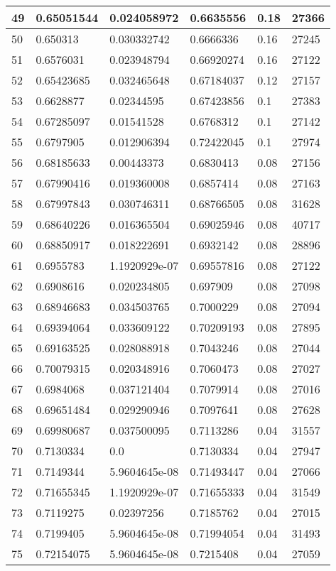 \begin{longtable}{|l|l|l|l|l|l|}
49 & 0.65051544 & 0.024058972 & 0.6635556 & 0.18 & 27366 \\ \hline 
50 & 0.650313 & 0.030332742 & 0.6666336 & 0.16 & 27245 \\ \hline 
51 & 0.6576031 & 0.023948794 & 0.66920274 & 0.16 & 27122 \\ \hline 
52 & 0.65423685 & 0.032465648 & 0.67184037 & 0.12 & 27157 \\ \hline 
53 & 0.6628877 & 0.02344595 & 0.67423856 & 0.1 & 27383 \\ \hline 
54 & 0.67285097 & 0.01541528 & 0.6768312 & 0.1 & 27142 \\ \hline 
55 & 0.6797905 & 0.012906394 & 0.72422045 & 0.1 & 27974 \\ \hline 
56 & 0.68185633 & 0.00443373 & 0.6830413 & 0.08 & 27156 \\ \hline 
57 & 0.67990416 & 0.019360008 & 0.6857414 & 0.08 & 27163 \\ \hline 
58 & 0.67997843 & 0.030746311 & 0.68766505 & 0.08 & 31628 \\ \hline 
59 & 0.68640226 & 0.016365504 & 0.69025946 & 0.08 & 40717 \\ \hline 
60 & 0.68850917 & 0.018222691 & 0.6932142 & 0.08 & 28896 \\ \hline 
61 & 0.6955783 & 1.1920929e-07 & 0.69557816 & 0.08 & 27122 \\ \hline 
62 & 0.6908616 & 0.020234805 & 0.697909 & 0.08 & 27098 \\ \hline 
63 & 0.68946683 & 0.034503765 & 0.7000229 & 0.08 & 27094 \\ \hline 
64 & 0.69394064 & 0.033609122 & 0.70209193 & 0.08 & 27895 \\ \hline 
65 & 0.69163525 & 0.028088918 & 0.7043246 & 0.08 & 27044 \\ \hline 
66 & 0.70079315 & 0.020348916 & 0.7060473 & 0.08 & 27027 \\ \hline 
67 & 0.6984068 & 0.037121404 & 0.7079914 & 0.08 & 27016 \\ \hline 
68 & 0.69651484 & 0.029290946 & 0.7097641 & 0.08 & 27628 \\ \hline 
69 & 0.69980687 & 0.037500095 & 0.7113286 & 0.04 & 31557 \\ \hline 
70 & 0.7130334 & 0.0 & 0.7130334 & 0.04 & 27947 \\ \hline 
71 & 0.7149344 & 5.9604645e-08 & 0.71493447 & 0.04 & 27066 \\ \hline 
72 & 0.71655345 & 1.1920929e-07 & 0.71655333 & 0.04 & 31549 \\ \hline 
73 & 0.7119275 & 0.02397256 & 0.7185762 & 0.04 & 27015 \\ \hline 
74 & 0.7199405 & 5.9604645e-08 & 0.71994054 & 0.04 & 31493 \\ \hline 
75 & 0.72154075 & 5.9604645e-08 & 0.7215408 & 0.04 & 27059 \\ \hline 
\end{longtable}